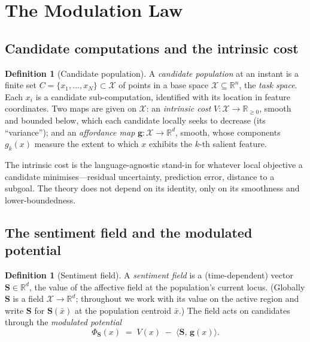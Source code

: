 \documentclass[11pt,a4paper]{article}
\theoremstyle{plain}
\theoremstyle{definition}
\newtheorem{definition}[theorem]{Definition}
\theoremstyle{remark}
\newcommand{\R}{\mathbb{R}}
\newcommand{\Rp}{\mathbb{R}_{\ge 0}}
\newcommand{\field}{\mathbf{S}}               %
\newcommand{\feat}{\mathbf{g}}                %
\newcommand{\Pot}{\Phi}                       %
\newcommand{\inner}[2]{\langle #1,\,#2\rangle}
\begin{document}
\section{The Modulation Law}
\label{sec:modulation}

\subsection{Candidate computations and the intrinsic cost}

\begin{definition}[Candidate population]
\label{def:population}
A \emph{candidate population} at an instant is a finite set
$C=\{x_1,\dots,x_N\}\subset\mathcal{X}$ of points in a base space
$\mathcal{X}\subseteq\R^n$, the \emph{task space}. Each $x_i$ is a candidate
sub-computation, identified with its location in feature coordinates. Two maps
are given on $\mathcal{X}$: an \emph{intrinsic cost} $V\colon\mathcal{X}\to\Rp$,
smooth and bounded below, which each candidate locally seeks to decrease (its
``variance''); and an \emph{affordance map} $\feat\colon\mathcal{X}\to\R^d$,
smooth, whose components $g_k(x)$ measure the extent to which $x$ exhibits the
$k$-th salient feature.
\end{definition}

The intrinsic cost is the language-agnostic stand-in for whatever local
objective a candidate minimises---residual uncertainty, prediction error,
distance to a subgoal. The theory does not depend on its identity, only on its
smoothness and lower-boundedness.

\subsection{The sentiment field and the modulated potential}

\begin{definition}[Sentiment field]
\label{def:field}
A \emph{sentiment field} is a (time-dependent) vector $\field\in\R^d$, the value
of the affective field at the population's current locus. (Globally $\field$ is
a field $\mathcal{X}\to\R^d$; throughout we work with its value on the active
region and write $\field$ for $\field(\bar x)$ at the population centroid
$\bar x$.) The field acts on candidates through the \emph{modulated potential}
\begin{equation}
\Pot_\field(x)\;=\;V(x)\;-\;\inner{\field}{\feat(x)}.
\label{eq:potential}
\end{equation}
\end{definition}
\end{document}
